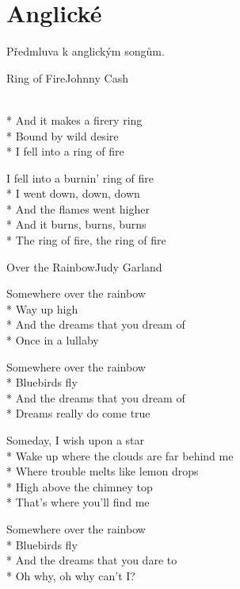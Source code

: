 \documentclass[10.5pt]{book}
\begin{document}
\section{Anglické}
Předmluva k anglickým songům. 

\newpage
\thispagestyle{empty}


\begin{poem}{Ring of Fire}{Johnny Cash}

\settowidth{\versewidth}{I fell into a burnin' ring of fire}

\\*
And it makes a firery ring\\*
Bound by wild desire\\*
I fell into a ring of fire

I fell into a burnin' ring of fire\\*
I went down, down, down\\*
And the flames went higher\\*
And it burns, burns, burns\\*
The ring of fire, the ring of fire

\end{poem}

\begin{poem}{Over the Rainbow}{Judy Garland}

\settowidth{\versewidth}{Wake up where the clouds are far behind me}

Somewhere over the rainbow\\*
Way up high\\*
And the dreams that you dream of\\*
Once in a lullaby

Somewhere over the rainbow\\*
Bluebirds fly\\*
And the dreams that you dream of\\*
Dreams really do come true

Someday, I wish upon a star\\*
Wake up where the clouds are far behind me\\*
Where trouble melts like lemon drops\\*
High above the chimney top\\*
That's where you'll find me

Somewhere over the rainbow\\*
Bluebirds fly\\*
And the dreams that you dare to\\*
Oh why, oh why can't I?

\end{poem}
\end{document}
